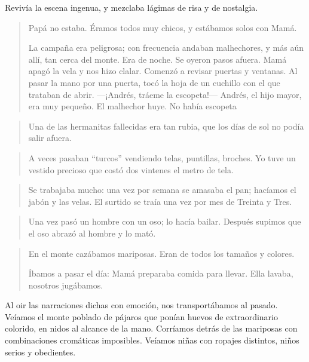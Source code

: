 \documentclass{article}
\begin{document}
Revivía la escena ingenua, y mezclaba lágimas de risa y de nostalgia.

\begin{quote}
    Papá no estaba. Éramos todos muy chicos, y estábamos solos con Mamá.

    La campaña era peligrosa; con frecuencia andaban malhechores, y más aún allí, tan cerca del monte. Era de noche. Se oyeron pasos afuera. Mamá apagó la vela y nos hizo clalar. Comenzó a revisar puertas y ventanas. Al pasar la mano por una puerta, tocó la hoja de un cuchillo con el que trataban de abrir. ---¡Andrés, tráeme la escopeta!--- Andrés, el hijo mayor, era muy pequeño. El malhechor huye. No había escopeta
\end{quote}

\begin{quote}
    Una de las hermanitas fallecidas era tan rubia, que los días de sol no podía salir afuera.
\end{quote}

\begin{quote}
    A veces pasaban ``turcos'' vendiendo telas, puntillas, broches. Yo tuve un vestido precioso que costó dos vintenes el metro de tela.
\end{quote}

\begin{quote}
    Se trabajaba mucho: una vez por semana se amasaba el pan; ha\-cí\-amos el jabón y las velas. El surtido se traía una vez por mes de Treinta y Tres.
\end{quote}

\begin{quote}
    Una vez pasó un hombre con un oso; lo hacía bailar. Después supimos que el oso abrazó al hombre y lo mató.
\end{quote}

\begin{quote}
    En el monte cazábamos mariposas. Eran de todos los tamaños y colores.

    Íbamos a pasar el día: Mamá preparaba comida para llevar. Ella lavaba, nosotros jugábamos.
\end{quote}

Al oir las narraciones dichas con emoción, nos transportábamos al pasado. Veíamos el monte poblado de pájaros que ponían huevos de extraordinario colorido, en nidos al alcance de la mano. Corríamos detrás de las mariposas con combinaciones cromáticas imposibles. Veíamos niñas con ropajes distintos, niños serios y obedientes.
\end{document}
